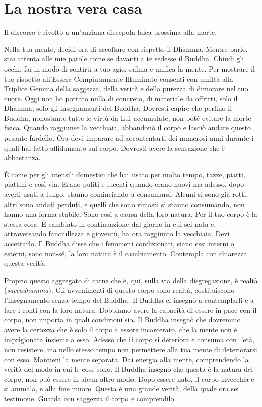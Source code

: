 \chapter{La nostra vera casa}

\begin{openingQuote}
  Il discorso è rivolto a un'anziana discepola laica prossima alla morte.
\end{openingQuote}

Nella tua mente, decidi ora di ascoltare con rispetto il Dhamma. Mentre
parlo, stai attenta alle mie parole come se davanti a te sedesse il
Buddha. Chiudi gli occhi, fai in modo di sentirti a tuo agio, calma e
unifica la mente. Per mostrare il tuo rispetto all'Essere Compiutamente
Illuminato consenti con umiltà alla Triplice Gemma della saggezza, della
verità e della purezza di dimorare nel tuo cuore. Oggi non ho portato
nulla di concreto, di materiale da offrirti, solo il Dhamma, solo gli
insegnamenti del Buddha. Dovresti capire che perfino il Buddha,
nonostante tutte le virtù da Lui accumulate, non poté evitare la morte
fisica. Quando raggiunse la vecchiaia, abbandonò il corpo e lasciò
andare questo pesante fardello. Ora devi imparare ad accontentarti dei
numerosi anni durante i quali hai fatto affidamento sul corpo. Dovresti
avere la sensazione che è abbastanza.

È come per gli utensili domestici che hai usato per molto tempo, tazze,
piatti, piattini e così via. Erano puliti e lucenti quando erano nuovi
ma adesso, dopo averli usati a lungo, stanno cominciando a consumarsi.
Alcuni si sono già rotti, altri sono andati perduti, e quelli che sono
rimasti si stanno consumando, non hanno una forma stabile. Sono così a
causa della loro natura. Per il tuo corpo è la stessa cosa. È cambiato
in continuazione dal giorno in cui sei nata e, attraversando
fanciullezza e gioventù, ha ora raggiunto la vecchiaia. Devi accettarlo.
Il Buddha disse che i fenomeni condizionati, siano essi interni o
esterni, sono non-sé, la loro natura è il cambiamento. Contempla con
chiarezza questa verità.

Proprio questo aggregato di carne che è, qui, sulla via della
disgregazione, è realtà (\emph{saccadhamma}). Gli avvenimenti di questo
corpo sono realtà, costituiscono l'insegnamento senza tempo del Buddha.
Il Buddha ci insegnò a contemplarli e a fare i conti con la loro natura.
Dobbiamo avere la capacità di essere in pace con il corpo, non importa
in quali condizioni sia. Il Buddha insegnò che dovremmo avere la
certezza che è solo il corpo a essere incarcerato, che la mente non è
imprigionata insieme a esso. Adesso che il corpo si deteriora e consuma
con l'età, non resistere, ma nello stesso tempo non permettere alla tua
mente di deteriorarsi con esso. Mantieni la mente separata. Dai energia
alla mente, comprendendo la verità del modo in cui le cose sono. Il
Buddha insegnò che questa è la natura del corpo, non può essere in alcun
altro modo. Dopo essere nato, il corpo invecchia e si ammala, e alla
fine muore. Questa è una grande verità, della quale ora sei testimone.
Guarda con saggezza il corpo e comprendilo.

